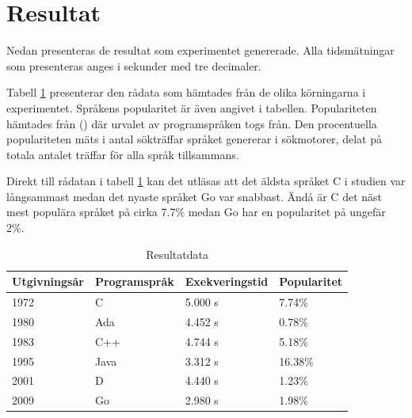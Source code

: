 \documentclass[12pt,swedish]{article}
\begin{document}
\newpage
\section{Resultat}
Nedan presenteras de resultat som experimentet genererade. Alla tidsmätningar som presenteras anges i sekunder med tre decimaler.

\begin{table}[H]
Tabell \ref{table:result} presenterar den rådata som hämtades från de olika körningarna i experimentet. Språkens popularitet är även angivet i tabellen. Populariteten hämtades från \citeauthor{tiobe} (\citeyear{tiobe}) där urvalet av programspråken togs från. Den procentuella populariteten mäts i antal sökträffar språket genererar i sökmotorer, delat på totala antalet träffar för alla språk tillsammans.

Direkt till rådatan i tabell \ref{table:result} kan det utläsas att det äldsta språket C i studien var långsammast medan det nyaste språket Go var snabbast. Ändå är C det näst mest populära språket på cirka 7.7\% medan Go har en popularitet på ungefär 2\%.
\begin{center}
\caption{Resultatdata}
\label{table:result}
\begin{tabular}{@{}llll@{}}
\toprule
Utgivningsår & Programspråk & Exekveringstid & Popularitet \\ \midrule
1972         & C            & 5.000 s        & 7.74\%      \\
1980         & Ada          & 4.452 s        & 0.78\%      \\
1983         & C++          & 4.744 s        & 5.18\%      \\
1995         & Java         & 3.312 s        & 16.38\%     \\
2001         & D            & 4.440 s        & 1.23\%      \\
2009         & Go           & 2.980 s        & 1.98\%      \\ \bottomrule
\end{tabular}
\end{center}
\end{table}
\end{document}
